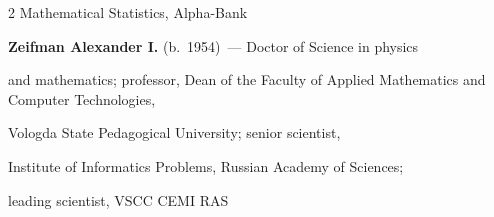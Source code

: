 \begin{multicols}{2}
Mathematical Statistics, Alpha-Bank





\vspace*{4pt}



\noindent

\textbf{Zeifman Alexander I.} (b.\ 1954)~--- Doctor of Science in physics 

and mathematics; professor, Dean of the Faculty of Applied Mathematics and Computer Technologies,

Vologda State Pedagogical University; senior scientist,

Institute of Informatics Problems, Russian Academy of Sciences;

leading scientist, VSCC CEMI RAS  







\def\leftfootline{\small{\textbf{\thepage}

\hfill ИНФОРМАТИКА И ЕЁ ПРИМЕНЕНИЯ\ \ \ том~6\ \ \ выпуск~4\ \ \ 2012}

}%

 \def\rightfootline{\small{ИНФОРМАТИКА И ЕЁ ПРИМЕНЕНИЯ\ \ \ том~6\ \ \ выпуск~4\ \ \ 2012

\hfill \textbf{\thepage}}}








\end{multicols}

\newpage





\newpage

